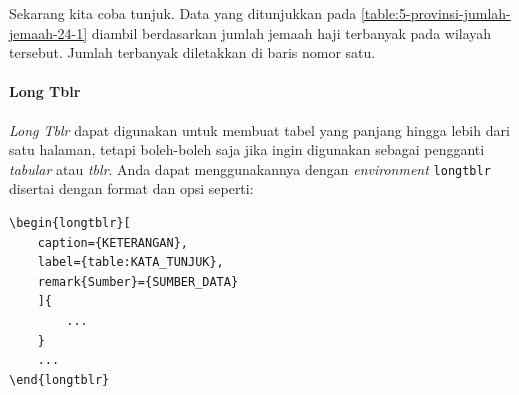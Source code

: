 \begin{enumerate}[label=\arabic*)]
    Sekarang kita coba tunjuk. Data yang ditunjukkan pada \autoref{table:5-provinsi-jumlah-jemaah-24-1} diambil berdasarkan jumlah jemaah haji terbanyak pada wilayah tersebut. Jumlah terbanyak diletakkan di baris nomor satu.
\end{enumerate}

\paragraph{Long Tblr}

\textit{Long Tblr} dapat digunakan untuk membuat tabel yang panjang hingga lebih dari satu halaman, tetapi boleh-boleh saja jika ingin digunakan sebagai pengganti \textit{tabular} atau \textit{tblr}. Anda dapat menggunakannya dengan \textit{environment} \texttt{longtblr} disertai dengan format dan opsi seperti:
\begin{lstlisting}
\begin{longtblr}[
    caption={KETERANGAN},
    label={table:KATA_TUNJUK},
    remark{Sumber}={SUMBER_DATA}
    ]{
        ...
    }
    ...
\end{longtblr}
\end{lstlisting}

